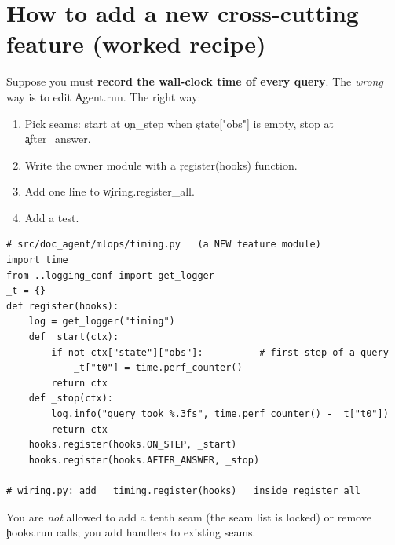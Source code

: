 \section{How to add a new cross-cutting feature (worked recipe)}
Suppose you must \textbf{record the wall-clock time of every query}. The \emph{wrong} way is to edit \c{Agent.run}. The right way:
\begin{enumerate}
 \item Pick seams: start at \c{on\_step} when \c{state["obs"]} is empty, stop at \c{after\_answer}.
 \item Write the owner module with a \c{register(hooks)} function.
 \item Add one line to \c{wiring.register\_all}.
 \item Add a test.
\end{enumerate}
\begin{lstlisting}
# src/doc_agent/mlops/timing.py   (a NEW feature module)
import time
from ..logging_conf import get_logger
_t = {}
def register(hooks):
    log = get_logger("timing")
    def _start(ctx):
        if not ctx["state"]["obs"]:          # first step of a query
            _t["t0"] = time.perf_counter()
        return ctx
    def _stop(ctx):
        log.info("query took %.3fs", time.perf_counter() - _t["t0"])
        return ctx
    hooks.register(hooks.ON_STEP, _start)
    hooks.register(hooks.AFTER_ANSWER, _stop)

# wiring.py: add   timing.register(hooks)   inside register_all
\end{lstlisting}
\begin{gotcha}
You are \emph{not} allowed to add a tenth seam (the seam list is locked) or remove \c{hooks.run} calls; you add handlers to existing seams.
\end{gotcha}

